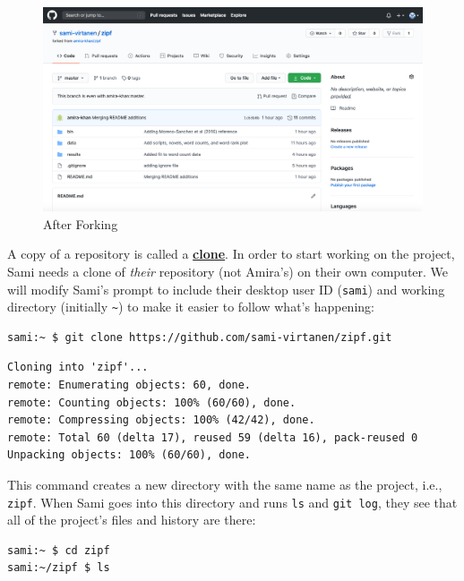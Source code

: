 \documentclass[
]{krantz}
\newcommand{\gref}[2]{\hyperlink{#2}{\textbf{#1}}}
\begin{document}
\begin{figure}

{\centering \includegraphics[width=1\linewidth]{figures/git-advanced/after-fork} 

}

\caption{After Forking}\label{fig:git-advanced-after-fork}
\end{figure}

A copy of a repository is called a \gref{clone}{git\_clone}.
In order to start working on the project,
Sami needs a clone of \emph{their} repository (not Amira's) on their own computer.
We will modify Sami's prompt to include their desktop user ID (\texttt{sami})
and working directory (initially \texttt{\textasciitilde{}})
to make it easier to follow what's happening:

\begin{verbatim}
sami:~ $ git clone https://github.com/sami-virtanen/zipf.git
\end{verbatim}

\begin{verbatim}
Cloning into 'zipf'...
remote: Enumerating objects: 60, done.
remote: Counting objects: 100% (60/60), done.
remote: Compressing objects: 100% (42/42), done.
remote: Total 60 (delta 17), reused 59 (delta 16), pack-reused 0
Unpacking objects: 100% (60/60), done.
\end{verbatim}

This command creates a new directory with the same name as the project,
i.e., \texttt{zipf}.
When Sami goes into this directory and runs \texttt{ls} and \texttt{git\ log},
they see that all of the project's files and history are there:

\begin{verbatim}
sami:~ $ cd zipf
sami:~/zipf $ ls
\end{verbatim}
\end{document}
